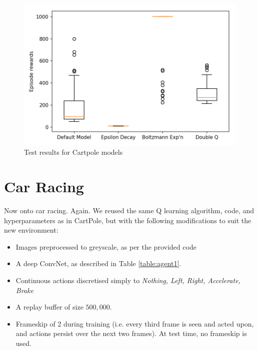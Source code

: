 \documentclass[a4paper, 11pt, conference]{ieeeconf}      %
\begin{document}
\begin{figure}
  \includegraphics[width=\linewidth]{figs/cartpole_test.png}
  \caption{Test results for Cartpole models}
  \label{fig:test0}
\end{figure}

\section{Car Racing}

Now onto car racing. Again. We reused the same Q learning algorithm, code, and hyperparameters as in CartPole, but with the following modifications to suit the new environment:

\begin{itemize}
	\item Images preprocessed to greyscale, as per the provided code

	\item A deep ConvNet, as described in Table \ref{table:agent1}.

  \item Continuous actions discretised simply to \textit{Nothing, Left, Right, Accelerate, Brake}

  \item A replay buffer of size $500,000$.

  \item Frameskip of 2 during training (i.e. every third frame is seen and acted upon, and actions persist over the next two frames). At test time, no frameskip is used.

\end{itemize}
\end{document}
